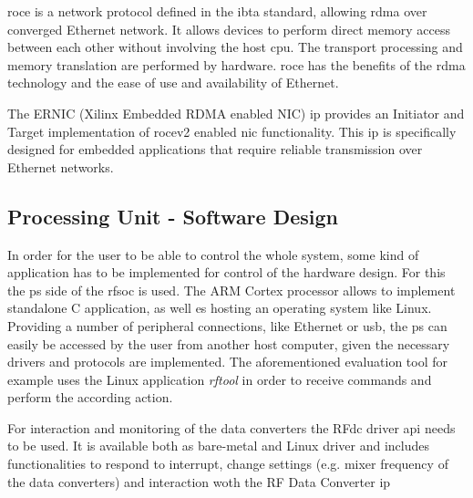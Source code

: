 \Gls{roce} is a network protocol defined in the \gls{ibta} standard, allowing \gls{rdma} over converged Ethernet network. 
It allows devices to perform direct memory access between each other without involving the host \gls{cpu}. 
The transport processing and memory translation are performed by hardware. 
\Gls{roce} has the benefits of the \gls{rdma} technology and the ease of use and availability of Ethernet.

The ERNIC (Xilinx Embedded RDMA enabled NIC) \gls{ip} provides an Initiator and Target  implementation of \gls{rocev2} enabled \gls{nic} functionality. This \gls{ip} is specifically designed for embedded applications that require reliable transmission over Ethernet networks.

\subsection{Processing Unit - Software Design}
In order for the user to be able to control the whole system, some kind of application has to be implemented for control of the hardware design.
For this the \gls{ps} side of the \gls{rfsoc} is used. 
The ARM Cortex processor allows to implement standalone C application, as well es hosting an operating system like Linux. 
Providing a number of peripheral connections, like Ethernet or \gls{usb}, the \gls{ps} can easily be accessed by the user from another host computer, given the necessary drivers and protocols are implemented. %
The aforementioned evaluation tool for example uses the Linux application \textit{rftool} in order to receive commands and perform the according action.


For interaction and monitoring of the data converters the RFdc driver \gls{api} needs to be used.
It is available both as bare-metal and Linux driver and includes functionalities to respond to interrupt, change settings (e.g. mixer frequency of the data converters) and interaction woth the RF Data Converter \gls{ip}


